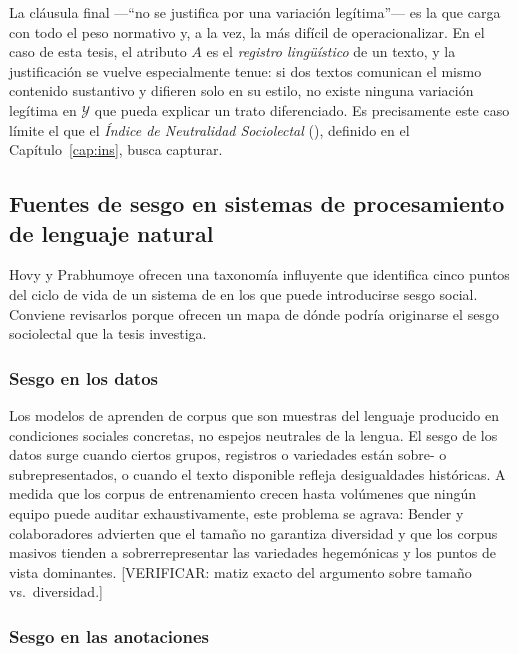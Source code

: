 La cláusula final ---``no se justifica por una variación legítima''--- es la que
carga con todo el peso normativo y, a la vez, la más difícil de operacionalizar.
En el caso de esta tesis, el atributo $A$ es el \emph{registro lingüístico} de
un texto, y la justificación se vuelve especialmente tenue: si dos textos
comunican el mismo contenido sustantivo y difieren solo en su estilo, no existe
ninguna variación legítima en $\mathcal{Y}$ que pueda explicar un trato
diferenciado. Es precisamente este caso límite el que el \emph{Índice de
Neutralidad Sociolectal} (\INS), definido en el Capítulo~\ref{cap:ins}, busca
capturar.

\subsection{Fuentes de sesgo en sistemas de procesamiento de lenguaje natural}
\label{sec:fuentes-sesgo}

Hovy y Prabhumoye \cite{HovyPrabhumoye2021} ofrecen una taxonomía influyente que
identifica cinco puntos del ciclo de vida de un sistema de \PLN en los que puede
introducirse sesgo social. Conviene revisarlos porque ofrecen un mapa de dónde
podría originarse el sesgo sociolectal que la tesis investiga.

\subsubsection{Sesgo en los datos}

Los modelos de \PLN aprenden de corpus que son muestras del lenguaje producido
en condiciones sociales concretas, no espejos neutrales de la lengua. El sesgo
de los datos surge cuando ciertos grupos, registros o variedades están
sobre- o subrepresentados, o cuando el texto disponible refleja desigualdades
históricas. A medida que los corpus de entrenamiento crecen hasta volúmenes que
ningún equipo puede auditar exhaustivamente, este problema se agrava: Bender
y colaboradores \cite{Bender2021Parrots} advierten que el tamaño no garantiza
diversidad y que los corpus masivos tienden a sobrerrepresentar las variedades
hegemónicas y los puntos de vista dominantes. [VERIFICAR: matiz exacto del
argumento sobre tamaño vs.\ diversidad.]

\subsubsection{Sesgo en las anotaciones}

